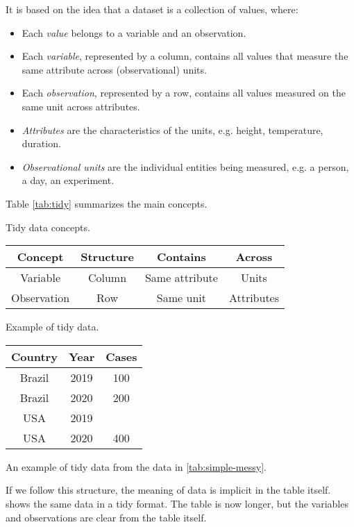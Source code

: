 It is based on the idea that a dataset is a collection of values, where:
\begin{itemize}
  \itemsep0em
  \item Each \emph{value} belongs to a variable and an observation.
  \item Each \emph{variable}, represented by a column, contains all values that measure
    the same attribute across (observational) units.
  \item Each \emph{observation}, represented by a row, contains all values measured on the
    same unit across attributes.
  \item \emph{Attributes} are the characteristics of the units, e.g. height, temperature,
    duration.
  \item \emph{Observational units} are the individual entities being measured, e.g. a
    person, a day, an experiment.
\end{itemize}
Table \ref{tab:tidy} summarizes the main concepts.

\begin{tablebox}[label=tab:tidy]{Tidy data concepts.}
  \centering
  \begin{tabular}{cccc}
    \toprule
    \textbf{Concept} & \textbf{Structure} & \textbf{Contains} & \textbf{Across} \\
    \midrule
    Variable & Column & Same attribute & Units \\
    Observation & Row & Same unit & Attributes \\
    \bottomrule
  \end{tabular}
\end{tablebox}

\begin{tablebox}[label=tab:simple-tidy]{Example of tidy data.}
  \centering
  \begin{tabular}{ccc}
    \toprule
    \textbf{Country} & \textbf{Year} & \textbf{Cases} \\
    \midrule
    Brazil & 2019 & 100 \\
    Brazil & 2020 & 200 \\
    USA & 2019 & \\
    USA & 2020 & 400 \\
    \bottomrule
  \end{tabular}
  \tcblower
  An example of tidy data from the data in \cref{tab:simple-messy}.
\end{tablebox}

If we follow this structure, the meaning of data is implicit in the table itself.
 shows the same data in a tidy format.  The table is now longer, but
the variables and observations are clear from the table itself.

